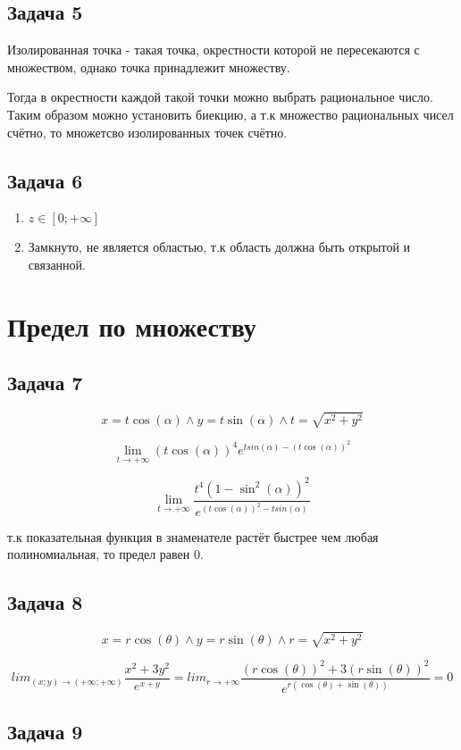 \documentclass[a4paper,12pt]{article}
\begin{document}
\subsection{Задача 5}
Изолированная точка - такая точка, окрестности которой не пересекаются с множеством, однако точка принадлежит множеству.

Тогда в окрестности каждой такой точки можно выбрать рациональное число. Таким образом можно установить биекцию, а т.к множество рациональных чисел счётно, то множетсво изолированных точек счётно.
\subsection{Задача 6}
\begin{enumerate}
    \item $z \in [0; +\infty]$
    \item Замкнуто, не является областью, т.к область должна быть открытой и связанной.
\end{enumerate}

\section{Предел по множеству}

\subsection{Задача 7}

\[
x = t\cos(\alpha) \land y = t\sin(\alpha) \land t = \sqrt{x^2+y^2}
\]

\[
\lim_{t \to +\infty} (t\cos(\alpha))^4e^{tsin(\alpha)-(t\cos(\alpha))^2}
\]

\[
\lim_{t \to +\infty} \frac{t^4(1-\sin^2(\alpha))^2}{e^{(t\cos(\alpha))^2-tsin(\alpha)}}
\]

т.к показательная функция в знаменателе растёт быстрее чем любая полиномиальная, то предел равен 0.

\subsection{Задача 8}

\[
x = r\cos(\theta) \land y = r\sin(\theta) \land r = \sqrt{x^2+y^2}
\]

\[
lim_{(x;y) \to (+\infty;+\infty)} \frac{x^2+3y^2}{e^{x+y}} = lim_{r \to +\infty} \frac{(r\cos(\theta))^2+3(r\sin(\theta))^2}{e^{r(\cos(\theta)+\sin(\theta))}}=0
\]

\subsection{Задача 9}
\end{document}
